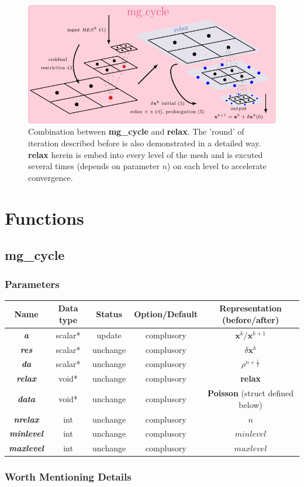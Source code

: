 \documentclass[a4paper]{article}
\newcommand{\func}[1]{\textbf{\textcolor{function}{#1}}}
\newcommand{\para}[1]{\textbf{\emph{\textcolor{para}{#1}}}}
\begin{document}
\begin{figure}[H]
    \centering
    \includegraphics[width=\textwidth]{image/mgcycle.pdf}
    \caption{Combination between \func{mg\_cycle} and \func{relax}. The 'round' of iteration described before is also demonstrated in a detailed way. \func{relax} herein is embed into every level of the mesh and is excuted several times (depends on parameter $n$) on each level to accelerate convergence.}
    \label{fig:mgcycle}
\end{figure}

\section{Functions}\label{sec:func}
\subsection{\func{mg\_cycle}}
\subsubsection{Parameters}
\begin{center}
  \begin{tabular}{|c|c|c|c|c|}
    \hline
    Name & Data type & Status & Option/Default & Representation (before/after)\\[0.5ex]
    \hline\hline
    \rowcolor{output}\para{a} & scalar* & update & complusory & $ \mathbf{x}^{k}/ \mathbf{x}^{k+1}$\\
    \hline
    \para{res} & scalar* & unchange & complusory & $ \delta \mathbf{x}^k$\\
    \hline
    \para{da} & scalar* & unchange & complusory & $\rho^{n+ \frac{1}{2}}$\\
    \hline
    \para{relax} & void* & unchange & complusory &  \func{relax}\\
    \hline
    \para{data} & void* & unchange & complusory &  \func{Poisson} (struct defined below)\\
    \hline
    \para{nrelax} & int & unchange & complusory & $n$ \\
    \hline
    \para{minlevel} & int & unchange & complusory & $minlevel$ \\
    \hline
    \para{maxlevel} & int & unchange & complusory & $maxlevel$ \\
    \hline
  \end{tabular}
\end{center}

\subsubsection{Worth Mentioning Details}
\printbibliography
\end{document}
